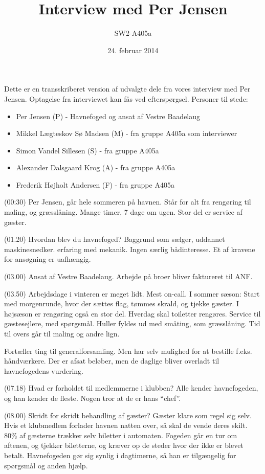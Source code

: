 \documentclass{article}
\begin{document}
\title{Interview med Per Jensen}
\author{SW2-A405a}
\date{24. februar 2014}
\maketitle
Dette er en transskriberet version af udvalgte dele fra vores interview med Per Jensen. Optagelse fra interviewet kan fås ved efterspørgsel. Personer til stede:

\begin{itemize}
    \item Per Jensen (P) - Havnefoged og ansat af Vestre Baadelaug
    \item Mikkel Lægteskov Sø Madsen (M) - fra gruppe A405a som interviewer
    \item Simon Vandel Sillesen (S) - fra gruppe A405a
    \item Alexander Dalsgaard Krog (A) - fra gruppe A405a
    \item Frederik Højholt Andersen (F) - fra gruppe A405a
\end{itemize}

(00:30) Per Jensen, går hele sommeren på havnen. Står for alt fra rengøring til maling, og græsslåning. Mange timer, 7 dage om ugen. Stor del er service af gæster.

(01.20) Hvordan blev du havnefoged? Baggrund som sælger, uddannet maskinesnedker. erfaring med mekanik. Ingen særlig bådinteresse. Et af kravene for ansøgning er uafhængig.

(03.00) Ansat af Vestre Baadelaug. Arbejde på broer bliver faktureret til ANF.

(03.50) Arbejdsdage i vinteren er meget lidt. Mest on-call. I sommer sæson: Start med morgenrunde, hvor der sættes flag, tømmes skrald, og tjekke gæster. I højsæson er rengøring også en stor del. Hverdag skal toiletter rengøres. Service til gæstesejlere, med spørgsmål. Huller fyldes ud med småting, som græsslåning. Tid til overs går til maling og andre lign.

Fortæller ting til generalforsamling. Men har selv mulighed for at bestille f.eks. håndværkere. Der er afsat beløber, men de daglige bliver overladt til havnefogedens vurdering.

(07.18) Hvad er forholdet til medlemmerne i klubben? Alle kender havnefogeden, og han kender de fleste. Nogen tror at de er hans “chef”.

(08.00) Skridt for skridt behandling af gæster? Gæster klare som regel sig selv. Hvis et klubmedlem forlader havnen natten over, så skal de vende deres skilt. 80\% af gæsterne trækker selv biletter i automaten. Fogeden går en tur om aftenen, og tjekker biletterne, og kræver op de steder hvor der ikke er blevet betalt. Havnefogeden gør sig synlig i dagtimerne, så han er tilgængelig for spørgsmål og anden hjælp.
\end{document}
